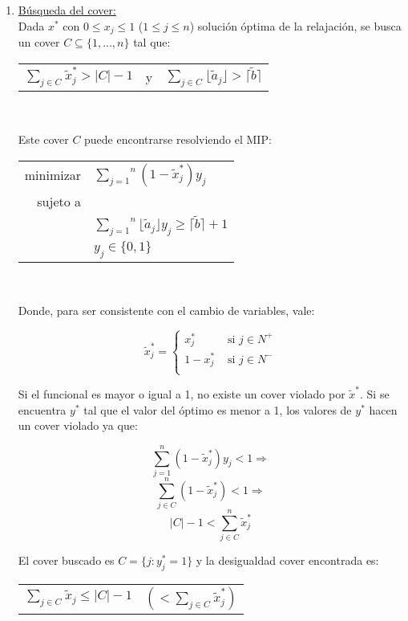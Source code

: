 \begin{enumerate}
\item \underline{Búsqueda del cover:}\\
Dada $x^*$ con $0\leq x_j \leq 1$ ($1\leq j \leq n$) solución óptima de la relajación, se busca un cover $C\subseteq \{1,...,n\}$ tal que:

{
\centering
\begin{tabular}{ccc}
$\overset{}{\underset{j \in C}{\sum}} \tilde{x}^*_j > |C|-1$ & y & $\overset{}{\underset{j \in C}{\sum}} \lfloor \tilde{a}_j \rfloor > \lceil \tilde{b} \rceil$\\
\end{tabular}\\
\vspace{5mm}
}

Este cover $C$ puede encontrarse resolviendo el MIP:

{
\centering
\begin{tabular}{rl}
minimizar & $\overset{n}{\underset{j=1}{\sum}} (1 - \tilde{x}^*_j) y_j$\\
sujeto a&\\
&$\overset{n}{\underset{j=1}{\sum}} \lfloor \tilde{a}_j \rfloor y_j \geq \lceil \tilde{b} \rceil + 1$\\
&$y_j \in \{0,1\}$\\
\end{tabular}\\
\vspace{5mm}
}

Donde, para ser consistente con el cambio de variables, vale:

$$\tilde{x}^*_j = 
\begin{cases}
x^*_j & \text{ si } j \in N^+\\
1-x^*_j & \text{ si } j \in N^-\\
\end{cases}$$

Si el funcional es mayor o igual a 1, no existe un cover violado por $\tilde{x}^*$. Si se encuentra $y^*$ tal que el valor del óptimo es menor a 1, los valores de $y^*$ hacen un cover violado ya que:

$$\overset{n}{\underset{j=1}{\sum}} (1 - \tilde{x}^*_j) y_j < 1 \Rightarrow$$
$$\overset{n}{\underset{j\in C}{\sum}} (1-\tilde{x}^*_j) < 1 \Rightarrow$$
$$|C| - 1 < \overset{n}{\underset{j\in C}{\sum}} \tilde{x}^*_j$$

El cover buscado es $C=\{j: y^*_j = 1\}$ y la desigualdad cover encontrada es:

{
\centering
\begin{tabular}{cc}
$\overset{}{\underset{j \in C}{\sum}} \tilde{x}_j \leq |C|-1$ & $(< \overset{}{\underset{j \in C}{\sum}} \tilde{x}^*_j)$\\
\end{tabular}\\
\vspace{5mm}
}


\end{enumerate}

